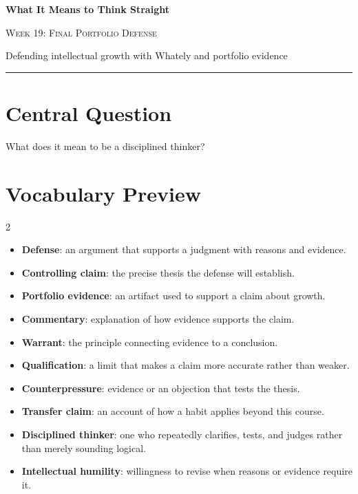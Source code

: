 \documentclass[12pt]{article}
\begin{document}
\begin{center}
{\LARGE\bfseries What It Means to Think Straight}\par\vspace{0.25em}
{\large\scshape Week 19: Final Portfolio Defense}\par\vspace{0.5em}
{Defending intellectual growth with Whately and portfolio evidence}\par\vspace{0.6em}
\rule{0.82\textwidth}{0.4pt}
\end{center}

\section*{Central Question}
What does it mean to be a disciplined thinker?

\section*{Vocabulary Preview}
\begin{multicols}{2}
\begin{itemize}[leftmargin=*, itemsep=0.18em]
\item \textbf{Defense}: an argument that supports a judgment with reasons and evidence.
\item \textbf{Controlling claim}: the precise thesis the defense will establish.
\item \textbf{Portfolio evidence}: an artifact used to support a claim about growth.
\item \textbf{Commentary}: explanation of how evidence supports the claim.
\item \textbf{Warrant}: the principle connecting evidence to a conclusion.
\item \textbf{Qualification}: a limit that makes a claim more accurate rather than weaker.
\item \textbf{Counterpressure}: evidence or an objection that tests the thesis.
\item \textbf{Transfer claim}: an account of how a habit applies beyond this course.
\item \textbf{Disciplined thinker}: one who repeatedly clarifies, tests, and judges rather than merely sounding logical.
\item \textbf{Intellectual humility}: willingness to revise when reasons or evidence require it.
\end{itemize}
\end{multicols}
\end{document}
